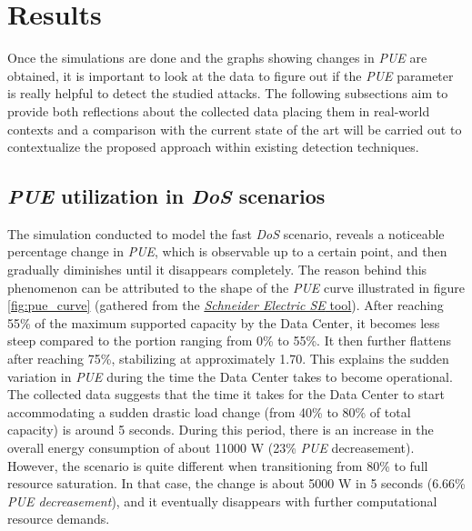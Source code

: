 \section{Results}
Once the simulations are done and the graphs showing changes in \emph{PUE} are obtained, it is important to look at the data to figure out if the \emph{PUE} parameter is really helpful to detect the studied attacks. The following subsections aim to provide both reflections about the collected data placing them in real-world contexts and a comparison with the current state of the art will be carried out to contextualize the proposed approach within existing detection techniques.

\subsection{\emph{PUE} utilization in \emph{DoS} scenarios}
The simulation conducted to model the fast \emph{DoS} scenario, reveals a noticeable percentage change in \emph{PUE}, which is observable up to a certain point, and then gradually diminishes until it disappears completely. The reason behind this phenomenon can be attributed to the shape of the \emph{PUE} curve illustrated in figure \ref{fig:pue_curve} (gathered from the \href{https://www.se.com/ww/en/work/solutions/system/s1/data-center-and-network-systems/trade-off-tools/data-center-efficiency-and-pue-calculator/}{\emph{Schneider Electric SE} tool}). After reaching 55\% of the maximum supported capacity by the Data Center, it becomes less steep compared to the portion ranging from 0\% to 55\%. It then further flattens after reaching 75\%, stabilizing at approximately 1.70. This explains the sudden variation in \emph{PUE} during the time the Data Center takes to become operational. The collected data suggests that the time it takes for the Data Center to start accommodating a sudden drastic load change (from 40\% to 80\% of total capacity) is around 5 seconds. During this period, there is an increase in the overall energy consumption of about 11000 W (23\% \emph{PUE} decreasement). However, the scenario is quite different when transitioning from 80\% to full resource saturation. In that case, the change is about 5000 W in 5 seconds (6.66\% \emph{\emph{PUE} decreasement}), and it eventually disappears with further computational resource demands. 

